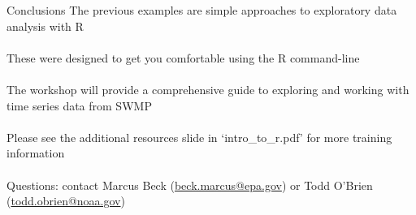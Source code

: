 \documentclass[xcolor=svgnames]{beamer}\usepackage[]{graphicx}\usepackage[]{color}
\begin{document}
\begin{frame}{Conclusions}
The previous examples are simple approaches to exploratory data analysis with R\\~\\
These were designed to get you comfortable using the R command-line\\~\\
The workshop will provide a comprehensive guide to exploring and working with time series data from SWMP\\~\\
Please see the additional resources slide in `intro\_to\_r.pdf' for more training information\\~\\
Questions: contact Marcus Beck (\href{mailto:beck.marcus@epa.gov}{beck.marcus@epa.gov}) or Todd O'Brien (\href{mailto:todd.obrien@noaa.gov}{todd.obrien@noaa.gov})
\end{frame}
\end{document}
